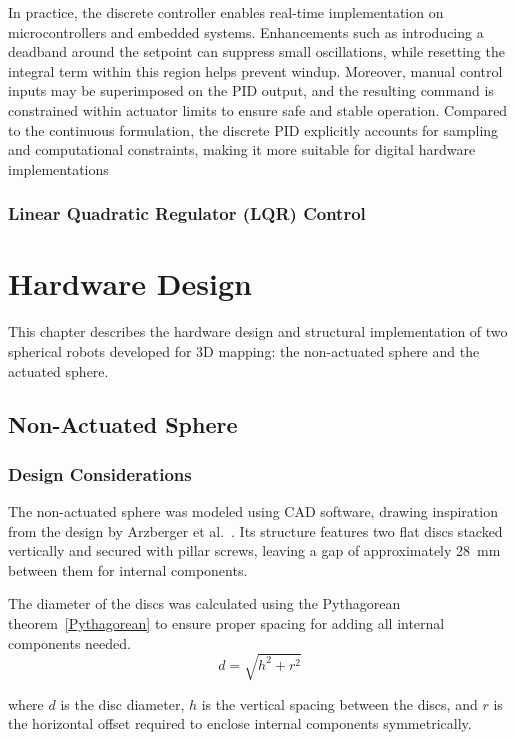 \documentclass[english, bachelor, utf8]{base/thesis_telematics}
\begin{document}
In practice, the discrete controller enables real-time implementation on microcontrollers and embedded systems. Enhancements such as introducing a deadband around the setpoint can suppress small oscillations, while resetting the integral term within this region helps prevent windup. Moreover, manual control inputs may be superimposed on the PID output, and the resulting command is constrained within actuator limits to ensure safe and stable operation. Compared to the continuous formulation, the discrete PID explicitly accounts for sampling and computational constraints, making it more suitable for digital hardware implementations

\subsection{Linear Quadratic Regulator (LQR) Control}



\chapter{Hardware Design}
\label{sec:hardwaredesign}

This chapter describes the hardware design and structural implementation of two spherical robots developed for 3D mapping: the non-actuated sphere and the actuated sphere.

\section{Non-Actuated Sphere}
\subsection{Design Considerations}

The non-actuated sphere was modeled using CAD software, drawing inspiration from the design by Arzberger et al.~\cite{Kalman_filter_sphere}.
Its structure features two flat discs stacked vertically and secured with pillar screws, leaving a gap of approximately \SI{28}{\milli\meter} between them for internal components. 

The diameter of the discs was calculated using the Pythagorean theorem~\ref{Pythagorean} to ensure proper spacing for adding all internal components needed.
\begin{equation}
    d = \sqrt{h^2 + r^2} \label{Pythagorean}
\end{equation}


\noindent
where $d$ is the disc diameter, $h$ is the vertical spacing between the discs, and $r$ is the horizontal offset required to enclose internal components symmetrically.
\end{document}
